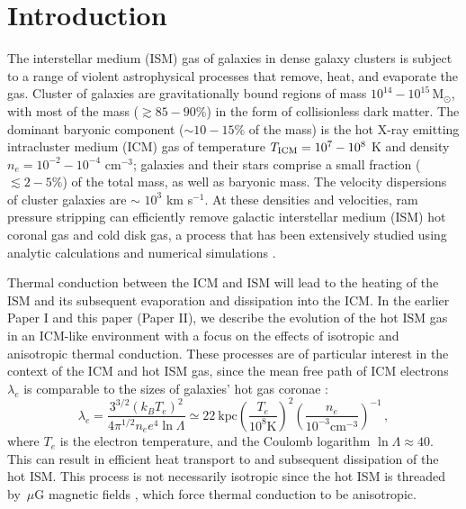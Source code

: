 \documentclass[twocolumn]{aastex6}
\newcommand{\msun}{\, \mbox{M}_{\odot}}
\newcommand{\muG}{\, \mu\mbox{G}}
\begin{document}
\section{Introduction}
\label{sec:intro}
The interstellar medium (ISM) gas of galaxies in dense galaxy clusters is subject to a range of violent astrophysical processes that remove, heat, and evaporate the gas. Cluster of galaxies are gravitationally bound regions of mass $10^{14} - 10^{15} \msun$, with most of the mass ($\gtrsim 85- 90\%$) in the form of collisionless dark matter. The dominant baryonic component ($\sim 10- 15\%$ of the mass) is the hot X-ray emitting intracluster medium (ICM) gas of temperature $T_{\rm ICM} = 10^7 - 10^8$ K and density $n_e = 10^{-2} - 10^{-4}$ cm$^{-3}$; galaxies and their stars comprise a small fraction ($\lesssim 2 - 5 \%$) of the total mass, as well as baryonic mass. The velocity dispersions of cluster galaxies are $\sim$ $10^3$ km s$^{-1}$. At these densities and velocities, ram pressure stripping can efficiently remove galactic interstellar medium (ISM) hot coronal gas and cold disk gas, a process that has been extensively studied using analytic calculations and numerical simulations \citep[e.g.,][]{Gunn72,Lea76,Gisler76,Larson80,Quilis00,Schulz01,Vollmer01,Roediger06,Kawata08,McCarthy08, Kapferer09,Tonnesen09, Ruszkowski14,Tonnesen14,Shin14,Roediger15a,Roediger15b,Vijayaraghavan15b}.

Thermal conduction between the ICM and ISM will lead to the heating of the ISM and its subsequent evaporation and dissipation into the ICM. In the earlier Paper I \citep{Vijayaraghavan17b} and this paper (Paper II), we describe the evolution of the hot ISM gas in an ICM-like environment with a focus on the effects of  isotropic and anisotropic thermal conduction. These processes are of particular interest in the context of the ICM and hot ISM gas, since the mean free path of ICM electrons $\lambda_e$ is comparable to the sizes of galaxies' hot gas coronae \citep{Spitzer62}:
\begin{equation}\label{eqn:lambdamfp}
\lambda_e = \frac{3^{3/2} (k_B T_e)^2}{4 \pi^{1/2} n_e e^{4} \ln \Lambda} \simeq 22~\textrm{kpc} \left(\frac{T_e}{10^8 \textrm{K}}\right)^2 \left(\frac{n_e}{10^{-3} \textrm{cm}^{-3}} \right)^{-1} \, ,
\end{equation}
where $T_e$ is the electron temperature, and the Coulomb logarithm $\ln \Lambda \approx 40$.
This can result in efficient heat transport to and subsequent dissipation of the hot ISM. This process is not necessarily isotropic since the hot ISM is threaded by $\muG$ magnetic fields  \citep[e.g.,][]{Vallee87,Clarke01,Carilli02,Govoni04,Kronberg05,Ryu12}, which force thermal conduction to be anisotropic.
\end{document}

